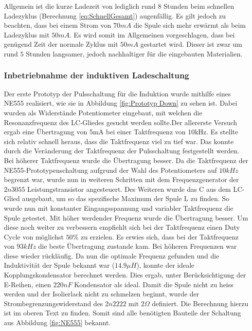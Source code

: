 Allgemein ist die kurze Ladezeit von lediglich rund $8$ Stunden beim schnellen Ladezyklus (Berechnung \ref{eq:SchnellGesamt}) augenfällig. Es gilt jedoch zu beachten, dass bei einem Strom von $70mA$ die Spule sich mehr erwärmt als beim Ladezyklus mit $50mA$. Es wird somit im Allgemeinen vorgeschlagen, dass bei genügend Zeit der normale Zyklus mit $50mA$ gestartet wird. Dieser ist zwar um rund $5$ Stunden langsamer, jedoch nachhaltiger für die eingebauten Materialien.


\subsubsection*{Inbetriebnahme der induktiven Ladeschaltung}\label{sec:erkenntnisse}

Der erste Prototyp der Pulsschaltung für die Induktion wurde mithilfe eines NE555 realisiert, wie sie in Abbildung \ref{fig:Prototyp Down} zu sehen ist. Dabei wurden als Widerstände Potentiometer eingebaut, mit welchen die Resonanzfrequenz des LC-Gliedes gesucht werden sollte.Der allererste Versuch ergab eine Übertragung von 5mA bei einer Taktfrequenz von 10kHz. Es stellte sich relativ schnell heraus, dass die Taktfrequenz viel zu tief war. Das konnte durch die Veränderung der Taktfrequenz der Pulsschaltung festgestellt werden. Bei höherer Taktfrequenz wurde die Übertragung besser. Da die Taktfrequenz der NE555-Prototypenschaltung aufgrund der Wahl des Potentiometers auf $10kHz$ begrenzt war, wurde nun in weiteren Schritten mit dem Frequenzgenerator der $2n3055$ Leistungstransistor angesteuert. Des Weiteren wurde das C aus dem LC-Glied ausgebaut, um so das spezifische Maximum der Spule L zu finden. So wurde nun mit konstanter Eingangsspannung und variabler Taktfrequenz die Spule getestet. Mit höher werdender Frequenz wurde die Übertragung besser. Um diese noch weiter zu verbessern empfiehlt sich bei der Taktfrequenz einen Duty Cycle von möglichst $50\%$ zu erzielen. Es erwies sich, dass bei der Taktfrequenz von $93kHz$ die beste Übertragung zustande kam. Bei höheren Frequenzen war diese wieder rückläufig. Da nun die optimale Frequenz gefunden und die Induktivität der Spule bekannt war ($14.9\mu H$), konnte der ideale Kopplungskondensator berechnet werden. Dies ergab, unter Berücksichtigung der E-Reihen, einen $220nF$ Kondensator als ideal. Damit die Spule nicht zu heiss werden und der Isolierlack nicht zu schmelzen beginnt, wurde der Strombegrenzungswiderstand des $2n2222$ mit $2\Omega$ definiert. Die Berechnung hierzu ist im oberen Text zu finden. Somit sind alle benötigten Bauteile der Schaltung aus Abbildung \ref{fig:NE555} bekannt.

